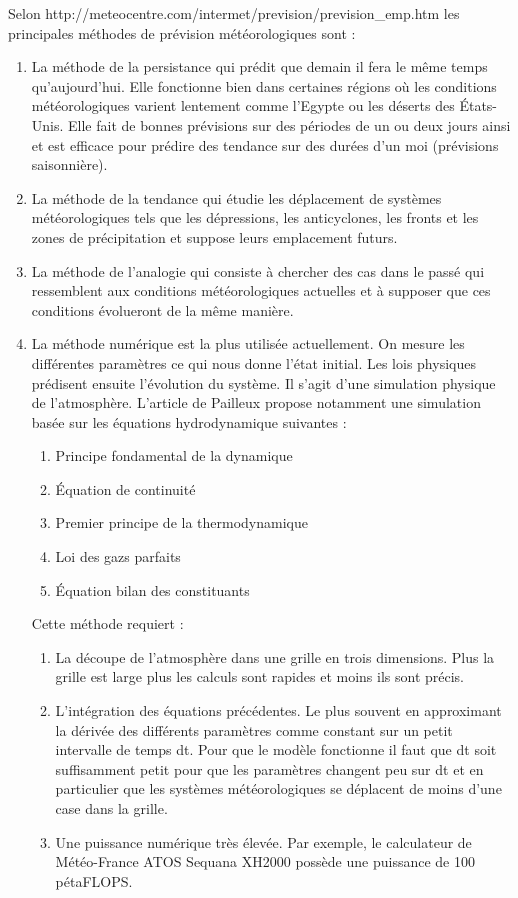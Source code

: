 \documentclass[11pt,a4paper]{article}
\begin{document}
Selon http://meteocentre.com/intermet/prevision/prevision\_emp.htm
les principales méthodes de prévision météorologiques sont :
\begin{enumerate}
\item La méthode de la persistance qui prédit que demain il fera le même temps qu'aujourd'hui. Elle fonctionne bien dans certaines régions où les conditions météorologiques varient lentement comme	l'Egypte ou les déserts des États-Unis. Elle fait de bonnes prévisions sur des périodes de un ou deux jours ainsi et est efficace pour prédire des tendance sur des durées d'un moi (prévisions saisonnière). 
\item La méthode de la tendance qui étudie les déplacement de systèmes météorologiques tels que les dépressions, les anticyclones, les fronts et les zones de précipitation et suppose leurs emplacement futurs.
\item La méthode de l'analogie qui consiste à chercher des cas dans le passé qui ressemblent aux conditions météorologiques actuelles et à supposer que ces conditions évolueront de la même manière.
\item La méthode numérique est la plus utilisée actuellement. On mesure les différentes paramètres ce qui nous donne l'état initial. Les lois physiques prédisent ensuite l'évolution du système. Il s'agit d'une simulation physique de l'atmosphère. L'article de Pailleux propose notamment une simulation basée sur les équations hydrodynamique suivantes : \begin {enumerate}
\item Principe fondamental de la dynamique
\item Équation de continuité
\item Premier principe de la thermodynamique
\item Loi des gazs parfaits
\item Équation bilan des constituants
\end {enumerate}
Cette méthode requiert :
\begin{enumerate} 
\item La découpe de l'atmosphère dans une grille en trois dimensions. Plus la grille est large plus les calculs sont rapides et moins ils sont précis.
\item L'intégration des équations précédentes. Le plus souvent en approximant la dérivée des différents paramètres comme constant sur un petit intervalle de temps dt. Pour que le modèle fonctionne il faut que dt soit suffisamment petit pour que les paramètres changent peu sur dt et en particulier que les systèmes météorologiques se déplacent de moins d'une case dans la grille.
\item Une puissance numérique très élevée. Par exemple, le calculateur de Météo-France ATOS Sequana XH2000 possède une puissance de 100 pétaFLOPS. 
\end {enumerate}
\end{enumerate}
\end{document}
